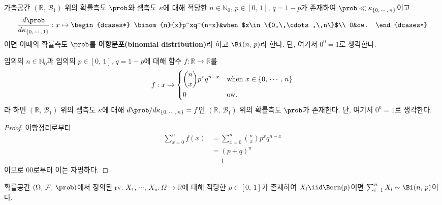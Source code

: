 \begin{definition}
    가측공간 $(\mathbb{R},\,\mathcal{B}_1)$ 위의 확률측도 $\prob$와 셈측도 $\kappa$에 대해 적당한 $n\in\mathbb{N}_0,\,p\in[0,\,1],\,q=1-p$가 존재하여 $\prob\ll\kappa_{\{0,\,\cdots,\,n\}}$이고
    \begin{equation*}
        \frac{d\prob}{d\kappa_{\{0,\,\cdots,\,1\}}}:x\mapsto
        \begin{dcases*}
            \binom{n}{x}p^xq^{n-x}&when $x\in\{0,\,\cdots,\,n\}$\\
            0&ow.
        \end{dcases*}
    \end{equation*}
    이면 이때의 확률측도 $\prob$를 \textbf{이항분포(binomial distribution)}라 하고 $\Bi(n,\,p)$라 한다. 단, 여기서 $0^0=1$로 생각한다.
\end{definition}

\begin{proposition}
    임의의 $n\in\mathbb{N}_0$과 임의의 $p\in[0,\,1],\,q=1-p$에 대해 함수 $f:\mathbb{R}\to\mathbb{R}$를
    \begin{equation*}
        f:x\mapsto
        \begin{dcases*}
            \binom{n}{x}p^xq^{n-x}&when $x\in\{0,\,\cdots,\,n\}$\\
            0&ow.
        \end{dcases*}
    \end{equation*}
    라 하면 $(\mathbb{R},\,\mathcal{B}_1)$ 위의 셈측도 $\kappa$에 대해 $d\prob/d\kappa_{\{0,\,\cdots,\,n\}}=f$인 $(\mathbb{R},\,\mathcal{B}_1)$ 위의 확률측도 $\prob$가 존재한다. 단, 여기서 $0^0=1$로 생각한다.
\end{proposition}

\begin{proof}
    이항정리로부터
    \begin{align*}
        \sum_{x=0}^nf(x)&=\sum_{x=0}^n\binom{n}{x}p^xq^{n-x}\\
        &=(p+q)^n\\
        &=1
    \end{align*}
    이므로 00로부터 이는 자명하다.
\end{proof}

\begin{theorem}\label{thm:bernoulliSum}
    확률공간 $(\Omega,\,\mathcal{F},\,\prob)$에서 정의된 rv. $X_1,\,\cdots,\,X_n:\Omega\to\mathbb{R}$에 대해 적당한 $p\in[0,\,1]$가 존재하여 $X_i\iid\Bern(p)$이면 $\sum_{i=1}^nX_i\sim\Bi(n,\,p)$이다.
\end{theorem}


